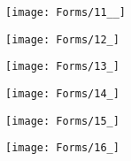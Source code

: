 \begin{figure}[h!]
    \centering
    \texttt{[image: Forms/11\_\_]}
\end{figure}

\begin{figure}[h!]
    \centering
    \texttt{[image: Forms/12\_]}
\end{figure}

\begin{figure}[h!]
    \centering
    \texttt{[image: Forms/13\_]}
\end{figure}

\begin{figure}[h!]
    \centering
    \texttt{[image: Forms/14\_]}
\end{figure}

\begin{figure}[h!]
    \centering
    \texttt{[image: Forms/15\_]}
\end{figure}

\begin{figure}[h!]
    \centering
    \texttt{[image: Forms/16\_]}
\end{figure}


